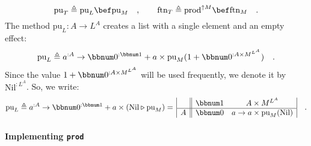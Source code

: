 ~\vspace{-1.2\baselineskip}
\begin{equation}
\text{pu}_{T}\triangleq\text{pu}_{L}\bef\text{pu}_{M}\quad,\quad\quad\text{ftn}_{T}\triangleq\text{prod}^{\uparrow M}\bef\text{ftn}_{M}\quad.\label{eq:def-pure-flatten-via-prod-for-list-monad-transformer}
\end{equation}
The method $\text{pu}_{L}:A\rightarrow L^{A}$ creates a list with
a single element and an empty effect:
\[
\text{pu}_{L}\triangleq a^{:A}\rightarrow\bbnum 0^{:\bbnum 1}+a\times\text{pu}_{M}(1+\bbnum 0^{:A\times M^{L^{A}}})\quad.
\]
Since the value $1+\bbnum 0^{:A\times M^{L^{A}}}$ will be used frequently,
we denote it by $\text{Nil}^{:L^{A}}$. So, we write:
\[
\text{pu}_{L}\triangleq a^{:A}\rightarrow\bbnum 0^{:\bbnum 1}+a\times(\text{Nil}\triangleright\text{pu}_{M})=\,\begin{array}{|c||cc|}
 & \bbnum 1 & A\times M^{L^{A}}\\
\hline A & \bbnum 0 & a\rightarrow a\times\text{pu}_{M}(\text{Nil})
\end{array}\quad.
\]


\paragraph{Implementing \texttt{prod}}

